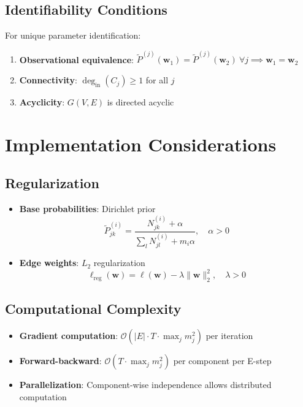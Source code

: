 \documentclass[answers,12pt,addpoints]{exam}
\begin{document}
\subsection{Identifiability Conditions}
For unique parameter identification:
\begin{enumerate}
    \item \textbf{Observational equivalence}: $\widetilde{P}^{(j)}(\mathbf{w}_1) = \widetilde{P}^{(j)}(\mathbf{w}_2) \: \forall j \implies \mathbf{w}_1 = \mathbf{w}_2$
    \item \textbf{Connectivity}: $\deg_{\text{in}}(C_j) \geq 1$ for all $j$
    \item \textbf{Acyclicity}: $G(V,E)$ is directed acyclic
\end{enumerate}

\section{Implementation Considerations}

\subsection{Regularization}
\begin{itemize}
    \item \textbf{Base probabilities}: Dirichlet prior
    \begin{equation}
        \tilde{P}^{(i)}_{jk} = \frac{N^{(i)}_{jk} + \alpha}{\sum_l N^{(i)}_{jl} + m_i \alpha}, \quad \alpha > 0
    \end{equation}
    
    \item \textbf{Edge weights}: $L_2$ regularization
    \begin{equation}
        \ell_{\text{reg}}(\mathbf{w}) = \ell(\mathbf{w}) - \lambda \|\mathbf{w}\|_2^2, \quad \lambda > 0
    \end{equation}
\end{itemize}

\subsection{Computational Complexity}
\begin{itemize}
    \item \textbf{Gradient computation}: $\mathscr{O}(|E| \cdot T \cdot \max_j m_j^2)$ per iteration
    \item \textbf{Forward-backward}: $\mathscr{O}(T \cdot \max_j m_j^2)$ per component per E-step
    \item \textbf{Parallelization}: Component-wise independence allows distributed computation
\end{itemize}
\end{document}
